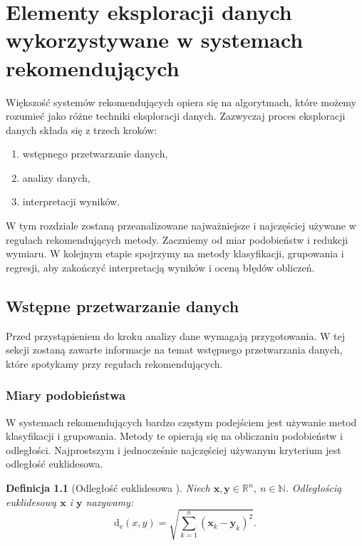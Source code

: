 \documentclass[12pt,a4paper]{report}
\newtheorem{df}{Definicja}[chapter]
\newcommand{\setR}{\mathbb{R}}
\newcommand{\setN}{\mathbb{N}}
\newcommand{\distanceee}[2]{\operatorname{d_e}\left({#1}, {#2} \right)}
\begin{document}
\chapter{Elementy eksploracji danych wykorzystywane w systemach rekomendujących}
Większość systemów rekomendujących opiera się na algorytmach, które możemy rozumieć jako różne techniki eksploracji danych. 
Zazwyczaj proces eksploracji danych składa się z trzech kroków:
\begin{enumerate}
\item wstępnego przetwarzanie danych,
\item analizy danych,
\item interpretacji wyników.
\end{enumerate}
W tym rozdziale zostaną przeanalizowane najważniejsze i najczęściej używane w regułach rekomendujących metody. Zaczniemy od miar podobieństw i redukcji wymiaru. W kolejnym etapie spojrzymy na metody klasyfikacji, grupowania i regresji, aby zakończyć interpretacją wyników i oceną błędów obliczeń.

\section{Wstępne przetwarzanie danych}
Przed przystąpieniem do kroku analizy dane wymagają przygotowania. W tej sekcji zostaną zawarte informacje na temat wstępnego przetwarzania danych, które spotykamy przy regułach rekomendujących.

\subsection{Miary podobieństwa}
W systemach rekomendujących bardzo częstym podejściem jest używanie metod klasyfikacji i grupowania. Metody te opierają się na obliczaniu podobieństw i odległości.
Najprostszym i jednocześnie najczęściej używanym kryterium jest odległość euklidesowa.

\begin{df}[Odległość euklidesowa \citep{rsh}]%

Niech $\mathbf{x},\mathbf{y} \in \setR^n $, $n \in\setN$. Odległością euklidesową $\mathbf{x}$ i $\mathbf{y}$ nazywamy:
$$
\distanceee{x}{y} = \sqrt{\sum_{k=1}^n(\mathbf{x}_k-\mathbf{y}_k)^2}.
$$
\end{df}
\end{document}
